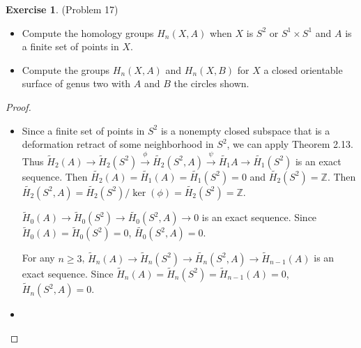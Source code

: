 \documentclass[12pt, psamsfonts]{amsart}
\theoremstyle{definition}
\newtheorem*{exer}{Exercise}
\theoremstyle{remark}
\numberwithin{equation}{section}
\begin{document}
\begin{exer}{(Problem 17)}
  $ $
  \begin{itemize}
    \item
      Compute the homology groups $H_n(X, A)$ when $X$ is $S^2$ or $S^1 \times S^1$ and $A$ is a finite set of points in $X$.
    \item
      Compute the groups $H_n(X, A)$ and $H_n(X, B)$ for $X$ a closed orientable surface of genus two with $A$ and $B$ the circles shown.
  \end{itemize}
\end{exer}

\begin{proof}
  $ $
  \begin{itemize}
    \item
      Since a finite set of points in $S^2$ is a nonempty closed subspace that is a deformation retract of some neighborhood in $S^2$, we can apply Theorem 2.13.
      Thus $\tilde{H}_2(A) \rightarrow \tilde{H}_2(S^2) \xrightarrow{\phi} \tilde{H_2}(S^2, A) \xrightarrow{\psi} \tilde{H_1}{A} \rightarrow \tilde{H_1}(S^2)$ is an exact sequence.
      Then $\tilde{H_2}(A) = \tilde{H_1}(A) = \tilde{H_1}(S^2) = 0$ and $\tilde{H_2}(S^2) = \mathbb{Z}$.
      Then $\tilde{H_2}(S^2, A) = \tilde{H_2}(S^2)/\ker(\phi) = \tilde{H_2}(S^2) = \mathbb{Z}$.

      $\tilde{H}_0(A) \rightarrow \tilde{H}_0(S^2) \rightarrow \tilde{H_0}(S^2, A) \rightarrow 0$ is an exact sequence.
      Since $\tilde{H}_0(A) = \tilde{H}_0(S^2) = 0$, $\tilde{H_0}(S^2, A) = 0$.

      For any $n \geq 3$, $\tilde{H}_n(A) \rightarrow \tilde{H}_n(S^2) \rightarrow \tilde{H_n}(S^2, A) \rightarrow \tilde{H}_{n - 1}(A)$ is an exact sequence.
      Since $\tilde{H}_n(A) = \tilde{H}_n(S^2) = \tilde{H}_{n - 1}(A) = 0$, $\tilde{H}_n(S^2, A) = 0$.
    \item
  \end{itemize}
\end{proof}
\end{document}
